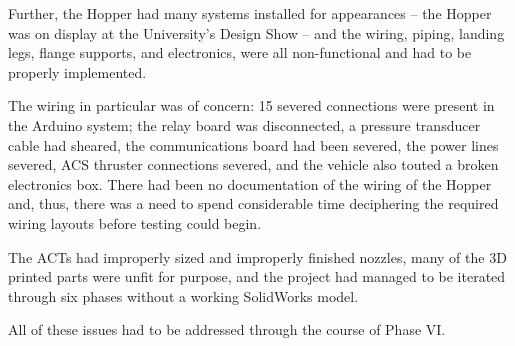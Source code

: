 \documentclass[12pt]{article}
\begin{document}
Further, the Hopper had many systems installed for appearances -- the Hopper was on display at the University's Design Show -- and the wiring, piping, landing legs, flange supports, and electronics, were all non-functional and had to be properly implemented.

The wiring in particular was of concern: 15 severed connections were present in the Arduino system; the relay board was disconnected, a pressure transducer cable had sheared, the communications board had been severed, the power lines severed, ACS thruster connections severed, and the vehicle also touted a broken electronics box. There had been no documentation of the wiring of the Hopper and, thus, there was a need to spend considerable time deciphering the required wiring layouts before testing could begin.

The ACTs had improperly sized and improperly finished nozzles, many of the 3D printed parts were unfit for purpose, and the project had managed to be iterated through six phases without a working SolidWorks model.

All of these issues had to be addressed through the course of Phase VI.
\end{document}
